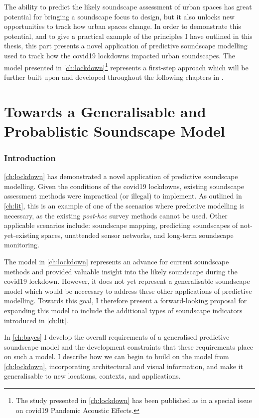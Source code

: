 \documentclass[twoside,fontsize=12pt,titlepage,chapterprefix=true
]{scrbook}
\begin{document}
The ability to predict the likely soundscape assessment of urban spaces has great potential for bringing a soundscape focus to design, but it also unlocks new opportunities to track how urban spaces change. In order to demonstrate this potential, and to give a practical example of the principles I have outlined in this thesis, this part presents a novel application of predictive soundscape modelling used to track how the \gls{covid19} lockdowns impacted urban soundscapes. The model presented in \cref{ch:lockdown}\footnote{The study presented in \cref{ch:lockdown} has been published as \citep{Mitchell2021Investigating} in a special issue on \gls{covid19} Pandemic Acoustic Effects. } represents a first-step approach which will be further built upon and developed throughout the following chapters in \cref{part:generalModel}.



\part{Towards a Generalisable and Probablistic Soundscape Model}
\label{part:generalModel}
\section*{Introduction}
\cref{ch:lockdown} has demonstrated a novel application of predictive soundscape modelling. Given the conditions of the \gls{covid19} lockdowns, existing soundscape assessment methods were impractical (or illegal) to implement. As outlined in \cref{ch:lit}, this is an example of one of the scenarios where predictive modelling is necessary, as the existing \emph{post-hoc} survey methods cannot be used. Other applicable scenarios include: soundscape mapping, predicting soundscapes of not-yet-existing spaces, unattended sensor networks, and long-term soundscape monitoring.

The model in \cref{ch:lockdown} represents an advance for current soundscape methods and provided valuable insight into the likely soundscape during the \gls{covid19} lockdown. However, it does not yet represent a generalisable soundscape model which would be neccesary to address these other applications of predictive modelling. Towards this goal, I therefore present a forward-looking proposal for expanding this model to include the additional types of soundscape indicators introduced in \cref{ch:lit}.

In \cref{ch:bayes} I develop the overall requirements of a generalised predictive soundscape model and the development constraints that these requirements place on such a model. I describe how we can begin to build on the model from \cref{ch:lockdown}, incorporating architectural and visual information, and make it generalisable to new locations, contexts, and applications.
\end{document}
